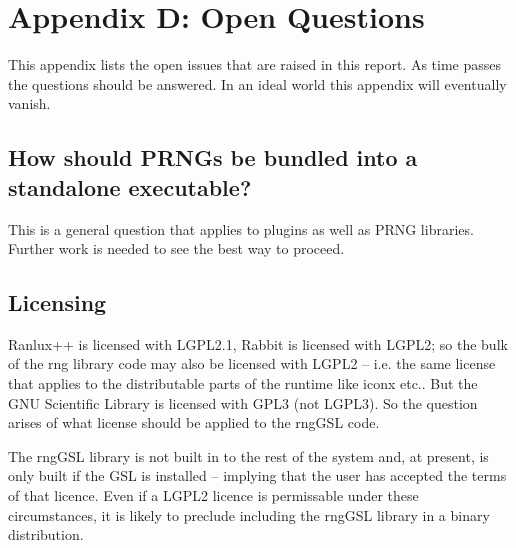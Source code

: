 \documentclass[letterpaper,12pt]{article}
\begin{document}


\section*{Appendix D: Open Questions}
This appendix lists the open issues that are raised in this report. As time
passes the questions should be answered. In an ideal world this appendix
will eventually vanish.

\subsection*{How should PRNGs be bundled into a standalone executable?}
This is a general question that applies to plugins as well as PRNG
libraries. Further work is needed to see the best way to proceed.

\subsection*{Licensing}
Ranlux++ is licensed with LGPL2.1, Rabbit is licensed with LGPL2; so the bulk of the rng
library code may also be licensed with LGPL2 -- i.e. the same license that applies to the
distributable parts of the runtime like iconx etc.. But the GNU Scientific Library is
licensed with GPL3 (not LGPL3). So the question arises of what license should be applied
to the rngGSL code.

The rngGSL library is not built in to the rest of the system and, at present, is only
built if the GSL is installed -- implying that the user has accepted the terms of that
licence.  Even if a LGPL2 licence is permissable under these circumstances, it is likely
to preclude including the rngGSL library in a binary distribution.
\end{document}
